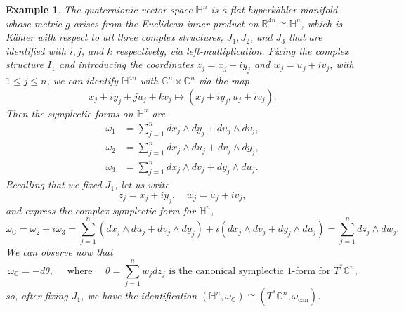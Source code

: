 \documentclass{amsart}
\newtheorem{example}{Example}
\newcommand{\w}{\omega}
\newcommand{\RR}{\mathbb{R}}
\newcommand{\CC}{\mathbb{C}}
\newcommand{\HH}{\mathbb{H}}
\begin{document}
	\begin{example}
		The quaternionic vector space $\HH^{n}$ is a flat hyperk\"ahler manifold whose metric $g$ arises from the Euclidean inner-product on $\RR^{4n}\cong \HH^{n}$, which is K\"ahler with respect to all three complex structures, $J_{1}, J_{2}$, and $J_{3}$ that are identified with $i, j$, and $k$ respectively, via left-multiplication. Fixing the complex structure $I_{1}$ and introducing the coordinates $z_{j} = x_{j} + i y_{j}$ and $w_{j} = u_{j} + i v_{j}$, with $1 \leq j \leq n$, we can identify $\HH^{4n}$ with $\CC^{n} \times \CC^{n}$ via the map
		\[
		x_{j} + iy_{j} + ju_{j} + kv_{j} \mapsto (x_{j} + iy_{j}, u_{j} + iv_{j}).
		\]
		Then the symplectic forms on $\HH^{n}$ are
		\begin{equation*}
			\begin{split}
				\w_{1} &= \sum_{j=1}^{n} dx_{j} \wedge dy_{j} + du_{j} \wedge dv_{j}, \\
				\w_{2} &= \sum_{j=1}^{n} dx_{j} \wedge du_{j} + dv_{j} \wedge dy_{j}, \\
				\w_{3} &= \sum_{j=1}^{n} dx_{j} \wedge dv_{j} + dy_{j} \wedge du_{j}.
			\end{split}
		\end{equation*}
		Recalling that we fixed $J_{1}$, let us write
		\[
		z_{j} = x_{j} + iy_{j}, \quad w_{j} = u_{j} + iv_{j},
		\]
		and express the complex-symplectic form for $\HH^{n}$,
		\[
		\w_{\CC} = \w_{2} + i\w_{3} = \sum_{j=1}^{n} \left( dx_{j} \wedge du_{j} + dv_{j} \wedge dy_{j} \right) + i \left( dx_{j} \wedge dv_{j} + dy_{j} \wedge du_{j} \right) = \sum_{j=1}^{n} dz_{j} \wedge dw_{j}.
		\]
		We can observe now that
		\[
		\w_{\CC} = -d\theta, \quad \text{ where } \quad \theta = \sum_{j=1}^{n} w_{j}dz_{j} \text{ is the canonical symplectic $1$-form for $T^{\ast}\CC^{n}$,}
		\]
		so, after fixing $J_{1}$, we have the identification $(\HH^{n}, \w_{\CC}) \cong (T^{\ast}\CC^{n}, \w_{\text{can}})$.
	\end{example}
	
\end{document}
